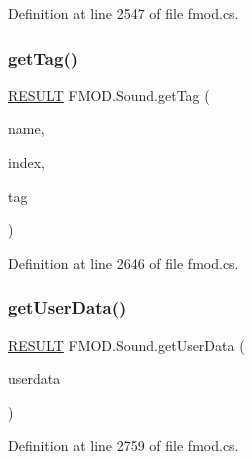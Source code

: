 Definition at line 2547 of file fmod.\+cs.

\mbox{\label{class_f_m_o_d_1_1_sound_a792d78fc59da623296625a408204c605}} 
\subsubsection{\texorpdfstring{get\+Tag()}{getTag()}}
{\footnotesize\ttfamily \hyperlink{namespace_f_m_o_d_a305d1176ef3f8c8815861a60407ac33d}{R\+E\+S\+U\+LT} F\+M\+O\+D.\+Sound.\+get\+Tag (\begin{DoxyParamCaption}\item[{string}]{name,  }\item[{int}]{index,  }\item[{out \hyperlink{struct_f_m_o_d_1_1_t_a_g}{T\+AG}}]{tag }\end{DoxyParamCaption})}



Definition at line 2646 of file fmod.\+cs.

\mbox{\label{class_f_m_o_d_1_1_sound_a3a6d3a6d07a5efbce7da1ba759343c59}} 
\subsubsection{\texorpdfstring{get\+User\+Data()}{getUserData()}}
{\footnotesize\ttfamily \hyperlink{namespace_f_m_o_d_a305d1176ef3f8c8815861a60407ac33d}{R\+E\+S\+U\+LT} F\+M\+O\+D.\+Sound.\+get\+User\+Data (\begin{DoxyParamCaption}\item[{out Int\+Ptr}]{userdata }\end{DoxyParamCaption})}



Definition at line 2759 of file fmod.\+cs.

\mbox{\label{class_f_m_o_d_1_1_sound_ae830bce396bbd6a7ed1cc79995930120}} 
